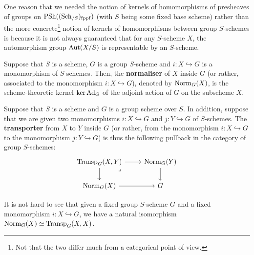            \begin{remark} \label{remark: representability_of_automorphism_groups_of_schemes}
                One reason that we needed the notion of kernels of homomorphisms of presheaves of groups on $\mathrm{PSh}((\mathrm{Sch}_{/S})_{\mathrm{fppf}})$ (with $S$ being some fixed base scheme) rather than the more concrete\footnote{Not that the two differ much from a categorical point of view.} notion of kernels of homomorphisms between group $S$-schemes is because it is not always guaranteed that for any $S$-scheme $X$, the automorphism group $\mathrm{Aut}(X/S)$ is representable by an $S$-scheme. 
            \end{remark}
            \begin{definition}[Normalisers] \label{def: normalisers}
                Suppose that $S$ is a scheme, $G$ is a group $S$-scheme and $i: X \hookrightarrow G$ is a monomorphism of $S$-schemes. Then, the \textbf{normaliser} of $X$ inside $G$ (or rather, associated to the monomorphism $i: X \hookrightarrow G$), denoted by $\mathrm{Norm}_G(X)$, is the scheme-theoretic kernel $\ker \mathrm{Ad}_G$ of the adjoint action of $G$ on the subscheme $X$.
            \end{definition}
            \begin{definition}[Transporters] \label{def: transporters}
                Suppose that $S$ is a scheme and $G$ is a group scheme over $S$. In addition, suppose that we are given two monomorphisms $i: X \hookrightarrow G$ and $j: Y \hookrightarrow G$ of $S$-schemes. The \textbf{transporter} from $X$ to $Y$ inside $G$ (or rather, from the monomorphism $i: X \hookrightarrow G$ to the monomorphism $j: Y \hookrightarrow G$) is thus the following pullback in the category of group $S$-schemes:
                    $$
                        \begin{tikzcd}
                        	{\Transporter_G(X, Y)} & {\Norm_G(Y)} \\
                        	{\Norm_G(X)} & G
                        	\arrow[from=1-1, to=2-1]
                        	\arrow[from=2-1, to=2-2]
                        	\arrow[from=1-1, to=1-2]
                        	\arrow[from=1-2, to=2-2]
                        	\arrow["\lrcorner"{anchor=center, pos=0.125}, draw=none, from=1-1, to=2-2]
                        \end{tikzcd}
                    $$
            \end{definition}
            \begin{remark}
                It is not hard to see that given a fixed group $S$-scheme $G$ and a fixed monomorphism $i: X \hookrightarrow G$, we have a natural isomorphism $\mathrm{Norm}_G(X) \simeq \mathrm{Transp}_G(X, X)$. 
            \end{remark}
